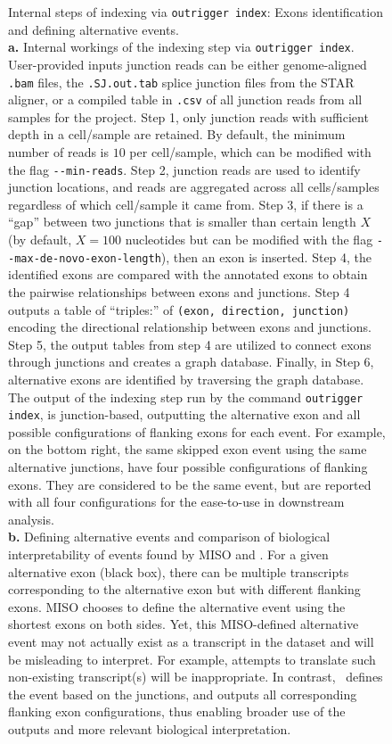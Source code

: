 \clearpage
\thispagestyle{facingcaption}
\begin{figure}[h]
\captionsetup{labelformat=prev-page}
  \caption[Internal steps of indexing via \texttt{outrigger index}: Exons identification and defining alternative events.]{
  Internal steps of indexing via \texttt{outrigger index}: Exons identification and defining alternative events.\\
\textbf{a.} Internal workings of the indexing step via \texttt{outrigger index}. User-provided inputs junction reads can be either genome-aligned \texttt{.bam} files, the \texttt{.SJ.out.tab} splice junction files from the STAR aligner, or a compiled table in \texttt{.csv} of all junction reads from all samples for the project. Step 1, only junction reads with sufficient depth in a cell/sample are retained. By default, the minimum number of reads is $10$ per cell/sample, which can be modified with the flag \texttt{-{}-min-reads}. Step 2, junction reads are used to identify junction locations, and reads are aggregated across all cells/samples regardless of which cell/sample it came from. Step 3, if there is a ``gap'' between two junctions that is smaller than certain length $X$ (by default, $X=100$ nucleotides but can be modified with the flag \texttt{-{}-max-de-novo-exon-length}), then an exon is inserted. Step 4, the identified exons are compared with the annotated exons to obtain the pairwise relationships between exons and junctions. Step 4 outputs a table of ``triples:'' of \texttt{(exon, direction, junction)} encoding the directional relationship between exons and junctions. Step 5, the output tables from step 4 are utilized to connect exons through junctions and creates a graph database. Finally, in Step 6, alternative exons are identified by traversing the graph database. The output of the indexing step run by the command \texttt{outrigger index}, is junction-based, outputting the alternative exon and all possible configurations of flanking exons for each event. For example, on the bottom right, the same skipped exon event using the same alternative junctions, have four possible configurations of flanking exons. They are considered to be the same event, but are reported with all four configurations for the ease-to-use in downstream analysis.\\
\textbf{b.} Defining alternative events and comparison of biological interpretability of events found by MISO and \outrigger. For a given alternative exon (black box), there can be multiple transcripts corresponding to the alternative exon but with different flanking exons. MISO chooses to define the alternative event using the shortest exons on both sides. Yet, this MISO-defined alternative event may not actually exist as a transcript in the dataset and will be misleading to interpret. For example, attempts to translate such non-existing transcript(s) will be inappropriate. In contrast, \outrigger\, defines the event based on the junctions, and outputs all corresponding flanking exon configurations, thus enabling broader use of the outputs and more relevant biological interpretation.
}
\label{fig:outrigger_index}
\end{figure}

